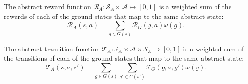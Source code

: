 The abstract reward function $\mathcal{R}_A: \mathcal{S}_A \times \mathcal{A} \mapsto [0,1]$ is a weighted sum of the rewards of each of the ground states that map to the same abstract state:
\begin{equation}
\mathcal{R}_A(s,a) = \sum_{g \in G(s)} \mathcal{R}_G(g,a) \omega(g) .
\end{equation}
\edefn

The abstract transition function $\mathcal{T}_A: \mathcal{S}_A \times \mathcal{A} \times \mathcal{S}_A \mapsto [0,1]$ is a weighted sum of the transitions of each of the ground states that map to the same abstract state:
\begin{equation}
\mathcal{T}_A(s,a,s') = \sum_{g \in G(s)} \sum_{g' \in G(s')} \mathcal{T}_G(g,a,g') \omega(g).
\end{equation}
\edefn













